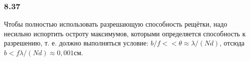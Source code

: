 \subsubsection*{8.37}
Чтобы полностью использовать разрешающую способность рещётки, надо несильно испортить остроту максимумов, которыми определяется способность к разрешению, т. е. должно выполняться условие: $b/f << \theta \approx \lambda / (Nd)$, отсюда $b < f \lambda / (Nd) \approx 0,001 см$.